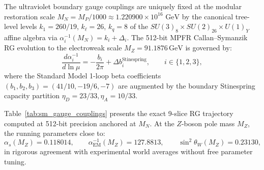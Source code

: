 \documentclass[11pt,letterpaper]{article}
\theoremstyle{plain}
\begin{document}
The ultraviolet boundary gauge couplings are uniquely fixed at the modular restoration scale $M_N = M_P / 1000 \approx 1.220900 \times 10^{16}\text{ GeV}$ by the canonical tree-level levels $k_1 = 260/19$, $k_\ell = 26$, $k_q = 8$ of the $SU(3)_8 \times SU(2)_{26} \times U(1)_Y$ affine algebra via $\alpha_i^{-1}(M_N) = k_i + \Delta_i$. The 512-bit MPFR Callan--Symanzik RG evolution to the electroweak scale $M_Z = 91.1876\,\mathrm{GeV}$ is governed by:
\begin{equation}
\label{eq:callan-symanzik-couplings}
\frac{d\alpha_i^{-1}}{d\ln\mu} = -\frac{b_i}{2\pi} + \Delta b_i^{\mathrm{Stinespring}}, \qquad i \in \{1, 2, 3\},
\end{equation}
where the Standard Model 1-loop beta coefficients $(b_1, b_2, b_3) = (41/10, -19/6, -7)$ are augmented by the boundary Stinespring capacity partition $\eta_D = 23/33, \eta_A = 10/33$.

Table~\ref{tab:sm_gauge_couplings} presents the exact 9-slice RG trajectory computed at 512-bit precision anchored at $M_N$. At the $Z$-boson pole mass $M_Z$, the running parameters close to:
\begin{equation}
\alpha_s(M_Z) = 0.118014, \qquad \alpha_{\mathrm{EM}}^{-1}(M_Z) = 127.8813, \qquad \sin^2\theta_W(M_Z) = 0.23130,
\end{equation}
in rigorous agreement with experimental world averages without free parameter tuning.
\end{document}
